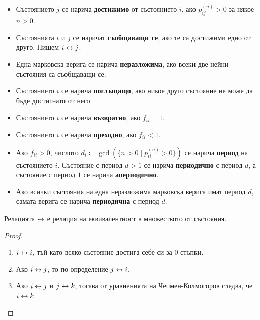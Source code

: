 \documentclass[numbers=endperiod, bibliography=totocnumbered]{scrartcl}
\begin{document}
\begin{definition}
  \mbox{}
  \begin{itemize}
    \item Състоянието \( j \) се нарича \textbf{достижимо} от състоянието \( i \), ако \( p^{(n)}_{ij} > 0 \) за някое \( n > 0 \).
    \item Състоянията \( i \) и \( j \) се наричат \textbf{съобщаващи се}, ако те са достижими едно от друго. Пишем \( i \leftrightarrow j \).
    \item Една марковска верига се нарича \textbf{неразложима}, ако всеки две нейни състояния са съобщаващи се.
    \item Състоянието \( i \) се нарича \textbf{поглъщащо}, ако никое друго състояние не може да бъде достигнато от него.
    \item Състоянието \( i \) се нарича \textbf{възвратно}, ако \( f_{ii} = 1 \).
    \item Състоянието \( i \) се нарича \textbf{преходно}, ако \( f_{ii} < 1 \).
    \item Ако \( f_{ii} > 0 \), числото \( d_i \coloneqq \gcd (\{ n > 0 \mid p_{ii}^{(n)} > 0 \}) \) се нарича \textbf{период} на състоянието \( i \). Състояние с период \( d > 1 \) се нарича \textbf{периодично} с период \( d \), а състояние с период \( 1 \) се нарича \textbf{апериодично}.
    \item Ако всички състояния на една неразложима марковска верига имат период \( d \), самата верига се нарича \textbf{периодична} с период \( d \).
  \end{itemize}
\end{definition}

\begin{proposition}
  Релацията \( \leftrightarrow \) е релация на еквивалентност в множеството от състояния.
\end{proposition}
\begin{proof}
  \mbox{}
  \begin{enumerate}
    \item \( i \leftrightarrow i \), тъй като всяко състояние достига себе си за \( 0 \) стъпки.
    \item Ако \( i \leftrightarrow j \), то по определение \( j \leftrightarrow i \).
    \item Ако \( i \leftrightarrow j \) и \( j \leftrightarrow k \), тогава от уравненията на Чепмен-Колмогоров следва, че \( i \leftrightarrow k \).
  \end{enumerate}
\end{proof}
\end{document}
